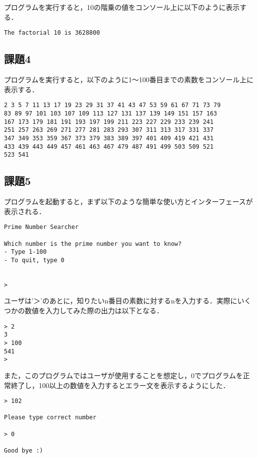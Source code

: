 \documentclass[a4j]{jarticle}
\begin{document}
プログラムを実行すると，10の階乗の値をコンソール上に以下のように表示する．

{\baselineskip 3mm
\begin{verbatim}
The factorial 10 is 3628800
\end{verbatim}
}


\subsection{課題4}

プログラムを実行すると，以下のように1〜100番目までの素数をコンソール上に表示する．  

{\baselineskip 3mm
\begin{verbatim}
2 3 5 7 11 13 17 19 23 29 31 37 41 43 47 53 59 61 67 71 73 79 
83 89 97 101 103 107 109 113 127 131 137 139 149 151 157 163 
167 173 179 181 191 193 197 199 211 223 227 229 233 239 241 
251 257 263 269 271 277 281 283 293 307 311 313 317 331 337 
347 349 353 359 367 373 379 383 389 397 401 409 419 421 431 
433 439 443 449 457 461 463 467 479 487 491 499 503 509 521 
523 541 
\end{verbatim}
}


\subsection{課題5}

プログラムを起動すると，まず以下のような簡単な使い方とインターフェースが表示される．

{\baselineskip 3mm
\begin{verbatim}
Prime Number Searcher

Which number is the prime number you want to know?
- Type 1-100
- To quit, type 0


> 
\end{verbatim}
}

ユーザは'＞'のあとに，知りたいn番目の素数に対するnを入力する．実際にいくつかの数値を入力してみた際の出力は以下となる．

{\baselineskip 3mm
\begin{verbatim}
> 2
3
> 100
541
> 
\end{verbatim}
}

また，このプログラムではユーザが使用することを想定し，0でプログラムを正常終了し，100以上の数値を入力するとエラー文を表示するようにした．

{\baselineskip 3mm
\begin{verbatim}
> 102

Please type correct number

> 0

Good bye :)
\end{verbatim}
}
\end{document}
